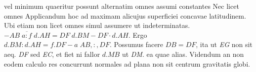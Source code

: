 vel minimum quaeritur possunt alternatim omnes assumi constantes
Nec licet omnes 
\pend
\pstart
Applicandum hoc ad maximam alicujus superficiei concavae latitudinem. 
Ubi etiam non licet omnes simul assumere ut indeterminatas.
\pend
\clearpage
\pstart
$-AB\;\overline{a:f}\;d.AH=DF\;d.BM-DF\cdot d.AH$. Ergo $d.BM:d.AH=f.DF-a\; AB,:,DF$.
Possumus facere $DB=DF$, ita ut \textit{EG} non sit aeq. \textit{DF} sed \textit{EC}, et fiet ni fallor $d.MB$ ut \textit{DM}.
ea quae alias.
\pend
\pstart 
Videndum an non eodem calculo res 
concurrunt normales ad plana non sit centrum gravitatis globi.
\pend
